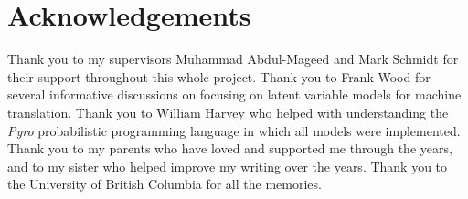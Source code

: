 
\chapter{Acknowledgements}




Thank you to my supervisors Muhammad Abdul-Mageed and Mark Schmidt for their support throughout this whole project. Thank you to Frank Wood for several informative discussions on focusing on  latent variable models for machine translation. Thank you to William Harvey who helped with understanding the \textit{Pyro} probabilistic programming language in which all models were implemented. Thank you to my parents who have loved and supported me through the years, and to my sister who helped improve my writing over the years. Thank you to the University of British Columbia for all the memories. 